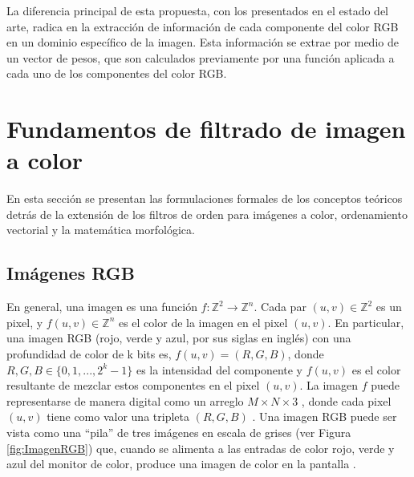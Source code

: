 La diferencia principal de esta propuesta, con los presentados en el estado del arte, radica en la extracci\'on de informaci\'on de cada componente del color RGB en un dominio espec\'ifico de la imagen. Esta informaci\'on se extrae por medio de un vector de pesos, que son calculados previamente por una funci\'on aplicada a cada uno de los componentes del color RGB. 



\section{Fundamentos de filtrado de imagen a color}
\label{Teo}

En esta sección se presentan las formulaciones formales de los conceptos teóricos detrás de la extensión de los filtros de orden para imágenes a color, ordenamiento vectorial y la matemática morfológica. 

\subsection{Im\'agenes RGB}

En general, una imagen es una funci\'on $f:\mathbb{Z}^2 \rightarrow \mathbb{Z}^n$.  Cada par $(u,v) \in \mathbb{Z}^2$ es un pixel, y $f(u,v) \in \mathbb Z^n $ es el color de la imagen en el pixel $(u,v)$. En particular, una imagen RGB (rojo, verde y azul, por sus siglas en inglés) con una profundidad de color de k bits es, $f(u,v) = (R,G,B)$, donde $R,G,B \in \{0,1,...,2^k-1\}$ es la intensidad del componente y $f(u,v)$ es el color resultante de mezclar estos componentes en el pixel $(u,v)$. %
La imagen $f$ puede representarse de manera digital como un arreglo $M \times N \times 3$ , donde cada pixel $(u,v)$ tiene como valor una tripleta $(R,G,B)$ \cite{gonzales2004digital}. Una imagen RGB puede ser vista como una ``pila'' de tres im\'agenes en escala de grises (ver Figura \ref{fig:ImagenRGB}) que, cuando se alimenta a las entradas de color rojo, verde y azul del monitor de color, produce una imagen de color en la pantalla \cite{gonzales2004digital}.


